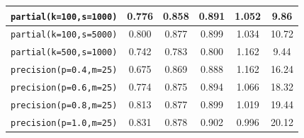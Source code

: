 \begin{table}[]
{\begin{tabular}{|c|c|c|c|c|c|}
\texttt{partial(k=100,s=1000)} & 0.776 & 0.858 & 0.891 & 1.052 & 9.86 \\ \hline
\texttt{partial(k=100,s=5000)} & 0.800 & 0.877 & 0.899 & 1.034 & 10.72 \\ \hline
\texttt{partial(k=500,s=1000)} & 0.742 & 0.783 & 0.800 & 1.162 & 9.44 \\ \hline
\hline
\texttt{precision(p=0.4,m=25)} & 0.675 & 0.869 & 0.888 & 1.162 & 16.24 \\ \hline
\texttt{precision(p=0.6,m=25)} & 0.774 & 0.875 & 0.894 & 1.066 & 18.32 \\ \hline
\texttt{precision(p=0.8,m=25)} & 0.813 & 0.877 & 0.899 & 1.019 & 19.44 \\ \hline
\texttt{precision(p=1.0,m=25)} & 0.831 & 0.878 & 0.902 & 0.996 & 20.12 \\ \hline
\end{tabular}
}
\end{table}

